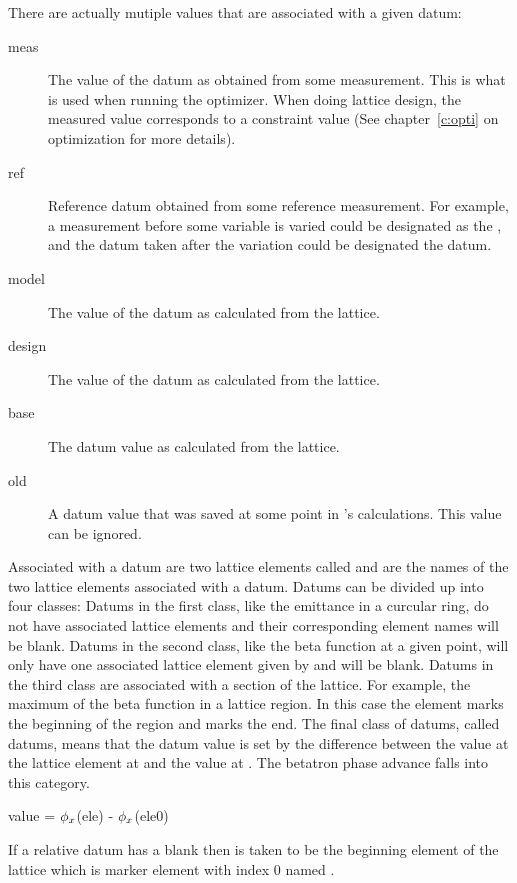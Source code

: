 There are actually mutiple values that are associated with a given datum:
\begin{description}
  \item[meas] \Newline 
The value of the datum as obtained from some measurement. This is what is used when
running the optimizer. When doing lattice design, the measured
value corresponds to a constraint value (See chapter~\ref{c:opti} on
optimization for more details).
  \item[ref] \Newline
Reference datum obtained from some reference measurement. For example,
a measurement before some variable is varied could be designated as
the , and the datum taken after the variation could be 
designated the  datum.
  \item[model] \Newline
The value of the datum as calculated from the  lattice.
  \item[design] \Newline
The value of the datum as calculated from the  lattice.
  \item[base] \Newline
The datum value as calculated from the  lattice.
  \item[old] \Newline
A datum value that was saved at some point in \tao's calculations. This value
can be ignored.
\end{description}

Associated with a datum are two lattice elements called
 and  are the names of the two lattice
elements associated with a datum. Datums can be divided up into four
classes: Datums in the first class, like the emittance in a curcular
ring, do not have associated lattice elements and their corresponding
element names will be blank. Datums in the second class, like the beta
function at a given point, will only have one associated lattice
element given by  and  will be blank.
Datums in the third class are associated with a section of the
lattice. For example, the maximum of the beta function in a lattice
region. In this case the  element marks the beginning of the
region and  marks the end. The final class of datums, called
 datums, means that the datum value is set by the
difference between the value at the lattice element at  and
the value at . The betatron phase advance falls into this
category.
\begin{example}
  value = \(\phi\sb{x}\)(ele) - \(\phi\sb{x}\)(ele0)
\end{example}
If a relative datum has a blank  then  is taken
to be the beginning element of the lattice which is marker element
with index 0 named .

